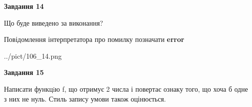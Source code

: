 \documentclass[11pt, ukrainian]{article}
\begin{document}
{\begin {large}
{\begin {center}\textbf{Завдання 14}\end {center}}\par
Що буде виведено за виконання? \par
Повідомлення інтерпретатора про помилку позначати \textbf{error}

\begin{center}
	{../pict/106_14.png}
\end{center}
\newpage

{\begin {center}\textbf{Завдання 15}\end {center}}\par

Написати функцiю f, що отримує 2 числа і повертає ознаку того, що хоча б одне з них не нуль. Стиль запису умови також оцінюється.\par
\newpage

\end {large}}
\end{document}
